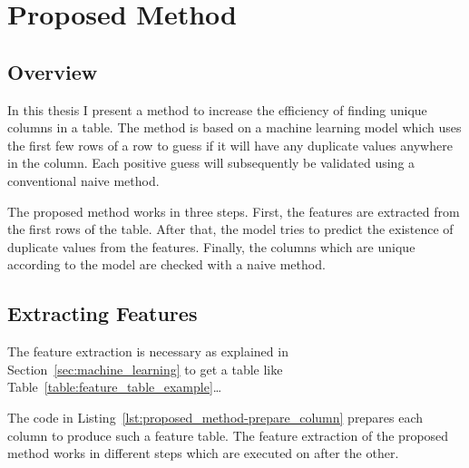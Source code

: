 \chapter{Proposed Method}\label{chap:proposed_method}
\section{Overview}\label{sec:overview}
In this thesis I present a method to increase the efficiency of finding unique columns in a table. The method is based on a machine learning model which uses the first few rows of a row to guess if it will have any duplicate values anywhere in the column. Each positive guess will subsequently be validated using a conventional naive method. %


The proposed method works in three steps. First, the features are extracted from the first rows of the table. After that, the model tries to predict the existence of duplicate values from the features. Finally, the columns which are unique according to the model are checked with a naive method.



\section{Extracting Features}\label{sec:extracted_features} %
The feature extraction is necessary as explained in Section~\ref{sec:machine_learning} to get a table like Table~\ref{table:feature_table_example}\ldots %




The code in Listing~\ref{lst:proposed_method-prepare_column} prepares each column to produce such a feature table. The feature extraction of the proposed method works in different steps which are executed on after the other.

